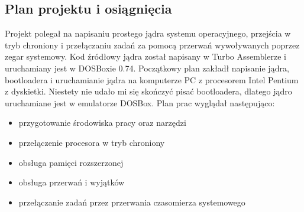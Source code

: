 \documentclass[a4paper,12pt]{article}
\begin{document}
		\subsection{Plan projektu i osiągnięcia}
		Projekt polegał na napisaniu prostego jądra systemu operacyjnego, przejścia w tryb chroniony i przełączaniu zadań za pomocą przerwań wywoływanych poprzez zegar systemowy. Kod źródłowy jądra został napisany w Turbo Assemblerze i uruchamiany jest w DOSBoxie 0.74. Początkowy plan zakładł napisanie jądra, bootloadera i uruchamianie jądra na komputerze PC z procesorem Intel Pentium z dyskietki. Niestety nie udało mi się skończyć pisać bootloadera, dlatego jądro uruchamiane jest w emulatorze DOSBox. Plan prac wyglądał następująco:
			\begin{itemize}
				\item{przygotowanie środowiska pracy oraz narzędzi}
				\item{przełączenie procesora w tryb chroniony}
				\item{obsługa pamięci rozszerzonej}
				\item{obsługa przerwań i wyjątków}
				\item{przełączanie zadań przez przerwania czasomierza systemowego}	
			\end{itemize}
\end{document}
